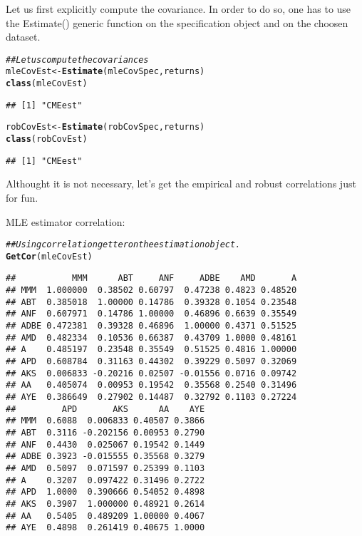 \documentclass[12pt,letterpaper,english]{article}\usepackage[]{graphicx}\usepackage[]{color}
\makeatletter
\newcommand{\hlcom}[1]{\textcolor[rgb]{0.678,0.584,0.686}{\textit{#1}}}%
\newcommand{\hlstd}[1]{\textcolor[rgb]{0.345,0.345,0.345}{#1}}%
\newcommand{\hlkwb}[1]{\textcolor[rgb]{0.69,0.353,0.396}{#1}}%
\newcommand{\hlkwd}[1]{\textcolor[rgb]{0.737,0.353,0.396}{\textbf{#1}}}%
\newenvironment{kframe}{%
 \def\at@end@of@kframe{}%
 \ifinner\ifhmode%
  \def\at@end@of@kframe{\end{minipage}}%
  \begin{minipage}{\columnwidth}%
 \fi\fi%
 \def\FrameCommand##1{\hskip\@totalleftmargin \hskip-\fboxsep
 \colorbox{shadecolor}{##1}\hskip-\fboxsep
     \hskip-\linewidth \hskip-\@totalleftmargin \hskip\columnwidth}%
 \MakeFramed {\advance\hsize-\width
   \@totalleftmargin\z@ \linewidth\hsize
   \@setminipage}}%
 {\par\unskip\endMakeFramed%
 \at@end@of@kframe}
\newenvironment{knitrout}{}{} %
\makeatother
\begin{document}
Let us first explicitly compute the covariance. In order to do so, one has to use the Estimate() generic function on the specification object and on the choosen dataset.
\begin{knitrout}
\color{fgcolor}\begin{kframe}
\begin{alltt}
\hlcom{## Let us compute the covariances}
\hlstd{mleCovEst} \hlkwb{<-} \hlkwd{Estimate}\hlstd{(mleCovSpec, returns)}
\hlkwd{class}\hlstd{(mleCovEst)}
\end{alltt}
\begin{verbatim}
## [1] "CMEest"
\end{verbatim}
\begin{alltt}
\hlstd{robCovEst} \hlkwb{<-} \hlkwd{Estimate}\hlstd{(robCovSpec, returns)}
\hlkwd{class}\hlstd{(robCovEst)}
\end{alltt}
\begin{verbatim}
## [1] "CMEest"
\end{verbatim}
\end{kframe}
\end{knitrout}

Althought it is not necessary, let's get the empirical and robust correlations just for fun.

MLE estimator correlation:
\begin{knitrout}
\color{fgcolor}\begin{kframe}
\begin{alltt}
\hlcom{## Using correlation getter on the estimation object.}
\hlkwd{GetCor}\hlstd{(mleCovEst)}
\end{alltt}
\begin{verbatim}
##           MMM      ABT     ANF     ADBE    AMD       A
## MMM  1.000000  0.38502 0.60797  0.47238 0.4823 0.48520
## ABT  0.385018  1.00000 0.14786  0.39328 0.1054 0.23548
## ANF  0.607971  0.14786 1.00000  0.46896 0.6639 0.35549
## ADBE 0.472381  0.39328 0.46896  1.00000 0.4371 0.51525
## AMD  0.482334  0.10536 0.66387  0.43709 1.0000 0.48161
## A    0.485197  0.23548 0.35549  0.51525 0.4816 1.00000
## APD  0.608784  0.31163 0.44302  0.39229 0.5097 0.32069
## AKS  0.006833 -0.20216 0.02507 -0.01556 0.0716 0.09742
## AA   0.405074  0.00953 0.19542  0.35568 0.2540 0.31496
## AYE  0.386649  0.27902 0.14487  0.32792 0.1103 0.27224
##         APD       AKS      AA    AYE
## MMM  0.6088  0.006833 0.40507 0.3866
## ABT  0.3116 -0.202156 0.00953 0.2790
## ANF  0.4430  0.025067 0.19542 0.1449
## ADBE 0.3923 -0.015555 0.35568 0.3279
## AMD  0.5097  0.071597 0.25399 0.1103
## A    0.3207  0.097422 0.31496 0.2722
## APD  1.0000  0.390666 0.54052 0.4898
## AKS  0.3907  1.000000 0.48921 0.2614
## AA   0.5405  0.489209 1.00000 0.4067
## AYE  0.4898  0.261419 0.40675 1.0000
\end{verbatim}
\end{kframe}
\end{knitrout}
\end{document}
